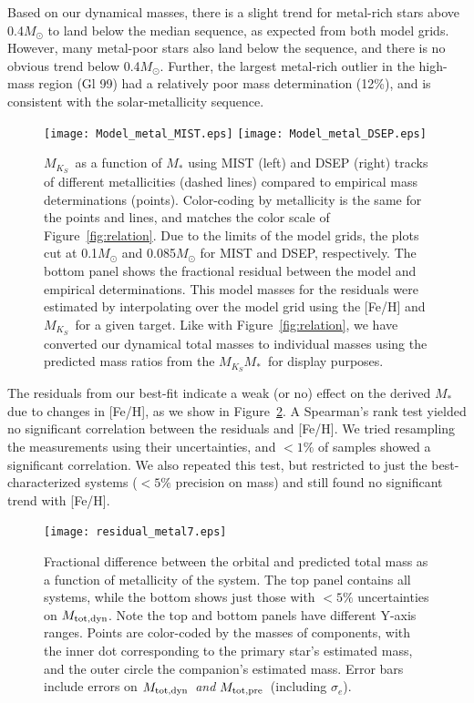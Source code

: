 \documentclass[twocolumn]{aastex62}
\newcommand{\mks}{$M_{K_S}$}
\newcommand{\mmk}{$M_{K_S}$\textendash$M_*$}
\newcommand{\mpred}{$M_{\rm{tot,pre}}$}
\newcommand{\mdyn}{$M_{\rm{tot,dyn}}$}
\begin{document}
Based on our dynamical masses, there is a slight trend for metal-rich stars above 0.4$M_\odot$ to land below the median sequence, as expected from both model grids. However, many metal-poor stars also land below the sequence, and there is no obvious trend below 0.4$M_\odot$. Further, the largest metal-rich outlier in the high-mass region (Gl 99) had a relatively poor mass determination (12\%), and is consistent with the solar-metallicity sequence. 

\begin{figure}[htp]
\begin{center}
\texttt{[image: Model\_metal\_MIST.eps]}
\texttt{[image: Model\_metal\_DSEP.eps]}
\caption{\mks\ as a function of $M_*$ using MIST (left) and DSEP (right) tracks of different metallicities (dashed lines) compared to empirical mass determinations (points). Color-coding by metallicity is the same for the points and lines, and matches the color scale of Figure~\ref{fig:relation}. Due to the limits of the model grids, the plots cut at 0.1$M_\odot$ and 0.085$M_\odot$ for MIST and DSEP, respectively. The bottom panel shows the fractional residual between the model and empirical determinations. This model masses for the residuals were estimated by interpolating over the model grid using the [Fe/H] and \mks\ for a given target. Like with Figure~\ref{fig:relation}, we have converted our dynamical total masses to individual masses using the predicted mass ratios from the \mmk\ for display purposes. }
\label{fig:mk_metal}
\end{center}
\end{figure}

The residuals from our best-fit indicate a weak (or no) effect on the derived $M_*$ due to changes in [Fe/H], as we show in Figure~\ref{fig:metal_resid}. A Spearman's rank test yielded no significant correlation between the residuals and [Fe/H]. We tried resampling the measurements using their uncertainties, and $<1\%$ of samples showed a significant correlation. We also repeated this test, but restricted to just the best-characterized systems ($<5\%$ precision on mass) and still found no significant trend with [Fe/H]. 

\begin{figure}[htp]
\begin{center}
\texttt{[image: residual\_metal7.eps]}
\caption{Fractional difference between the orbital and predicted total mass as a function of metallicity of the system. The top panel contains all systems, while the bottom shows just those with $<5\%$ uncertainties on \mdyn. Note the top and bottom panels have different Y-axis ranges. Points are color-coded by the masses of components, with the inner dot corresponding to the primary star's estimated mass, and the outer circle the companion's estimated mass. Error bars include errors on \mdyn\ {\it and} \mpred\ (including $\sigma_e$).}
\label{fig:metal_resid}
\end{center}
\end{figure}
\end{document}

